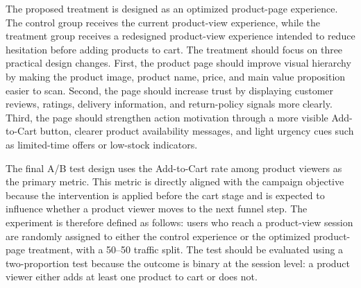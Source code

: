 \documentclass[conference]{IEEEtran}
\begin{document}
The proposed treatment is designed as an optimized product-page experience. The control group receives the current product-view experience, while the treatment group receives a redesigned product-view experience intended to reduce hesitation before adding products to cart. The treatment should focus on three practical design changes. First, the product page should improve visual hierarchy by making the product image, product name, price, and main value proposition easier to scan. Second, the page should increase trust by displaying customer reviews, ratings, delivery information, and return-policy signals more clearly. Third, the page should strengthen action motivation through a more visible Add-to-Cart button, clearer product availability messages, and light urgency cues such as limited-time offers or low-stock indicators.

The final A/B test design uses the Add-to-Cart rate among product viewers as the primary metric. This metric is directly aligned with the campaign objective because the intervention is applied before the cart stage and is expected to influence whether a product viewer moves to the next funnel step. The experiment is therefore defined as follows: users who reach a product-view session are randomly assigned to either the control experience or the optimized product-page treatment, with a 50--50 traffic split. The test should be evaluated using a two-proportion test because the outcome is binary at the session level: a product viewer either adds at least one product to cart or does not.
\end{document}

